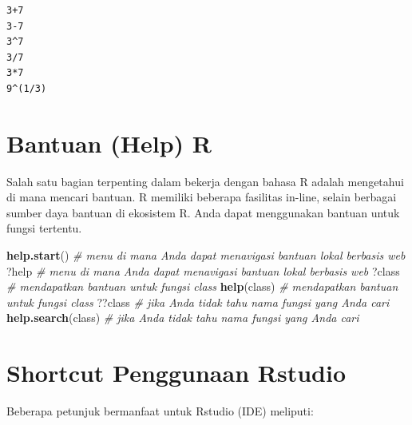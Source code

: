 \documentclass[
]{book}
\newenvironment{Shaded}{\begin{snugshade}}{\end{snugshade}}
\newcommand{\CommentTok}[1]{\textcolor[rgb]{0.56,0.35,0.01}{\textit{#1}}}
\newcommand{\FunctionTok}[1]{\textcolor[rgb]{0.13,0.29,0.53}{\textbf{#1}}}
\newcommand{\NormalTok}[1]{#1}
\newcommand{\StringTok}[1]{\textcolor[rgb]{0.31,0.60,0.02}{#1}}
\begin{document}
\begin{verbatim}
3+7
3-7
3^7
3/7
3*7
9^(1/3)
\end{verbatim}

\hypertarget{bantuan-help-r}{%
\section{Bantuan (Help) R}\label{bantuan-help-r}}

Salah satu bagian terpenting dalam bekerja dengan bahasa R adalah mengetahui di mana mencari bantuan. R memiliki beberapa fasilitas in-line, selain berbagai sumber daya bantuan di ekosistem R. Anda dapat menggunakan bantuan untuk fungsi tertentu.

\begin{Shaded}
\begin{Highlighting}[]
\FunctionTok{help.start}\NormalTok{()         }\CommentTok{\# menu di mana Anda dapat menavigasi bantuan lokal berbasis web}
\NormalTok{?help                }\CommentTok{\# menu di mana Anda dapat menavigasi bantuan lokal berbasis web }
\NormalTok{?class               }\CommentTok{\# mendapatkan bantuan untuk fungsi \textasciigrave{}class\textasciigrave{}}
\FunctionTok{help}\NormalTok{(class)          }\CommentTok{\# mendapatkan bantuan untuk fungsi \textasciigrave{}class\textasciigrave{}}
\NormalTok{??class              }\CommentTok{\# jika Anda tidak tahu nama fungsi yang Anda cari}
\FunctionTok{help.search}\NormalTok{(}\StringTok{\textquotesingle{}class\textquotesingle{}}\NormalTok{) }\CommentTok{\# jika Anda tidak tahu nama fungsi yang Anda cari}
\end{Highlighting}
\end{Shaded}

\hypertarget{shortcut-penggunaan-rstudio}{%
\section{Shortcut Penggunaan Rstudio}\label{shortcut-penggunaan-rstudio}}

Beberapa petunjuk bermanfaat untuk Rstudio (IDE) meliputi:
\end{document}
